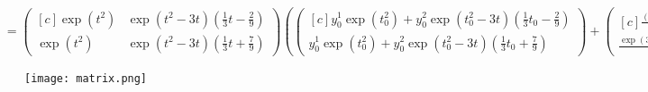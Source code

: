 \begin{solution}
\begin{align*}
        &= \begin{pmatrix*}[c]
          \exp(t^2) & \exp(t^2-3t)(\frac{1}{3}t - \frac{2}{9}) \\
          \exp(t^2) & \exp(t^2-3t)(\frac{1}{3}t + \frac{7}{9})
        \end{pmatrix*}
        \left(\begin{pmatrix*}[c]
            y_0^1\exp(t_0^2) + y_0^2\exp(t_0^2-3t)(\frac{1}{3}t_0 - \frac{2}{9}) \\
            y_0^1\exp(t_0^2) + y_0^2\exp(t_0^2-3t)(\frac{1}{3}t_0 + \frac{7}{9})
          \end{pmatrix*} +
        \begin{pmatrix*}[c]
            \frac{(t-t_0)^3 + 2(t-t_0)^2 + 2(t-t_0)}{9} \\
            \frac{\exp(3t)(4 - 3t) + \exp(3t_0)(3t_0 - 4)}{9}
          \end{pmatrix*} \right) =
\end{align*}
\FloatBarrier
\begin{figure}
    \centering
    \texttt{[image: matrix.png]}
\end{figure}
\FloatBarrier
\end{solution}
